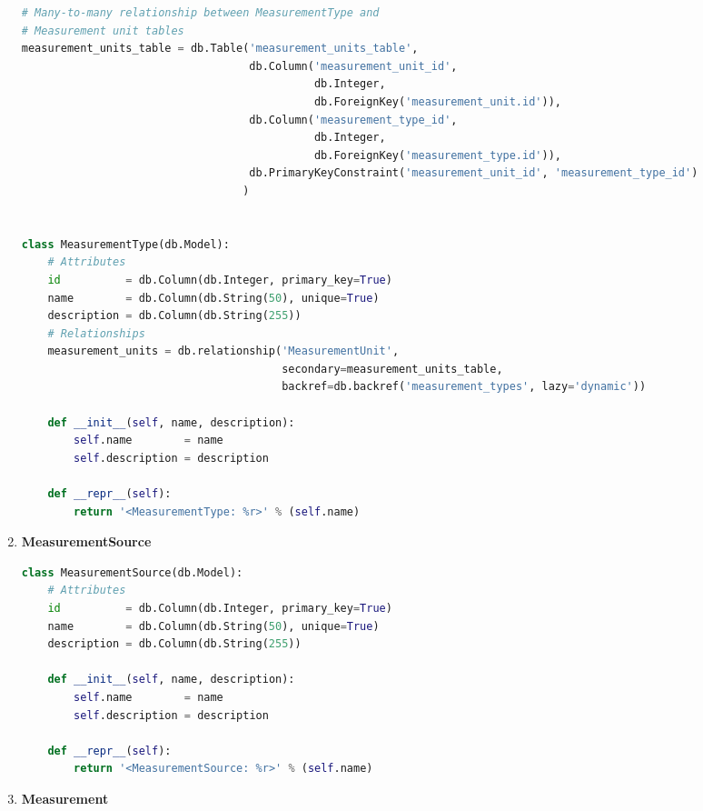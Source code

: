 \begin{enumerate}
\begin{lstlisting}[language=Python]
# Many-to-many relationship between MeasurementType and 
# Measurement unit tables
measurement_units_table = db.Table('measurement_units_table',
                                   db.Column('measurement_unit_id',
                                             db.Integer,
                                             db.ForeignKey('measurement_unit.id')),
                                   db.Column('measurement_type_id',
                                             db.Integer,
                                             db.ForeignKey('measurement_type.id')),
                                   db.PrimaryKeyConstraint('measurement_unit_id', 'measurement_type_id')
                                  )


class MeasurementType(db.Model):
    # Attributes
    id          = db.Column(db.Integer, primary_key=True)
    name        = db.Column(db.String(50), unique=True)
    description = db.Column(db.String(255))
    # Relationships
    measurement_units = db.relationship('MeasurementUnit',
                                        secondary=measurement_units_table,
                                        backref=db.backref('measurement_types', lazy='dynamic'))

    def __init__(self, name, description):
        self.name        = name
        self.description = description

    def __repr__(self):
        return '<MeasurementType: %r>' % (self.name)
\end{lstlisting}
	
\item \textbf{MeasurementSource}
	
\begin{lstlisting}[language=Python]
class MeasurementSource(db.Model):
    # Attributes
    id          = db.Column(db.Integer, primary_key=True)
    name        = db.Column(db.String(50), unique=True)
    description = db.Column(db.String(255))

    def __init__(self, name, description):
        self.name        = name
        self.description = description

    def __repr__(self):
        return '<MeasurementSource: %r>' % (self.name)
\end{lstlisting}
	
\item \textbf{Measurement}
	

\end{enumerate}
